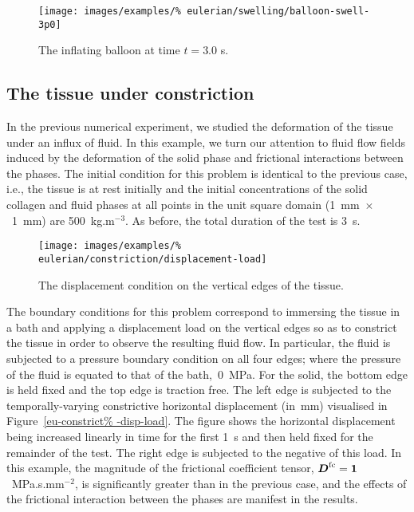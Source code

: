 \begin{figure}[!hptb]
  \centering
  \texttt{[image: images/examples/\%
    eulerian/swelling/balloon-swell-3p0]}
  \caption{The inflating balloon at time $t=3.0$ s.} 
  \label{swelling-balloon-image-3p0}
\end{figure}

\clearpage

\subsection{The tissue under constriction}
\label{constriction-2}

In the previous numerical experiment, we studied the deformation of
the tissue under an influx of fluid. In this example, we turn our
attention to fluid flow fields induced by the deformation of the solid
phase and frictional interactions between the phases. The initial
condition for this problem is identical to the previous case, i.e.,
the tissue is at rest initially and the initial concentrations of the
solid collagen and fluid phases at all points in the unit square
domain \mbox{(1~mm $\times$ 1~mm)} are 500~kg.m$^{-3}$. As before, the
total duration of the test is 3~s.

\begin{figure}[!hptb]
  \centering
  \texttt{[image: images/examples/\%
    eulerian/constriction/displacement-load]}
  \caption{The displacement condition on the vertical edges of the
    tissue.}
  \label{eu-constrict-disp-load}
\end{figure}

The boundary conditions for this problem correspond to immersing the
tissue in a bath and applying a displacement load on the vertical
edges so as to constrict the tissue in order to observe the resulting
fluid flow. In particular, the fluid is subjected to a pressure
boundary condition on all four edges; where the pressure of the fluid
is equated to that of the bath,~0~MPa. For the solid, the bottom edge
is held fixed and the top edge is traction free. The left edge is
subjected to the temporally-varying constrictive horizontal
displacement (in~mm) visualised in Figure~\ref{eu-constrict%
  -disp-load}. The figure shows the horizontal displacement being
increased linearly in time for the first 1~s and then held fixed for
the remainder of the test. The right edge is subjected to the negative
of this load. In this example, the magnitude of the frictional
coefficient tensor, $\mbox{\boldmath$ D$}^{\mathrm{fc}} = {\bf 1}$~MPa.s.mm$^{-2}$, is
significantly greater than in the previous case, and the effects of
the frictional interaction between the phases are manifest in the
results.

